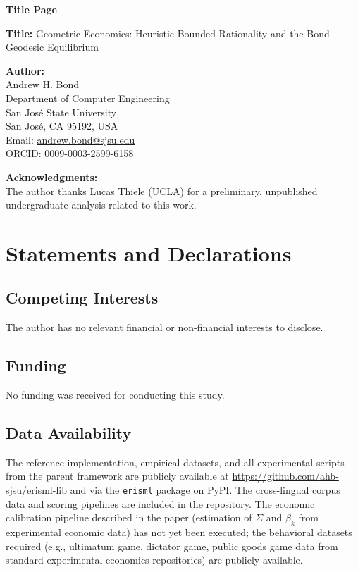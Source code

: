 \documentclass[12pt]{article}
\begin{document}
\begin{center}
{\LARGE\bfseries Title Page}
\end{center}

\bigskip

\noindent\textbf{Title:} Geometric Economics: Heuristic Bounded Rationality and the Bond Geodesic Equilibrium

\bigskip

\noindent\textbf{Author:}\\
Andrew H. Bond\\
Department of Computer Engineering\\
San Jos\'{e} State University\\
San Jos\'{e}, CA 95192, USA\\
Email: \href{mailto:andrew.bond@sjsu.edu}{andrew.bond@sjsu.edu}\\
ORCID: \href{https://orcid.org/0009-0003-2599-6158}{0009-0003-2599-6158}

\bigskip

\noindent\textbf{Acknowledgments:}\\
The author thanks Lucas Thiele (UCLA) for a preliminary, unpublished undergraduate analysis related to this work.

\bigskip

\section*{Statements and Declarations}

\subsection*{Competing Interests}
The author has no relevant financial or non-financial interests to disclose.

\subsection*{Funding}
No funding was received for conducting this study.

\subsection*{Data Availability}
The reference implementation, empirical datasets, and all experimental scripts from the parent framework are publicly available at \url{https://github.com/ahb-sjsu/erisml-lib} and via the \texttt{erisml} package on PyPI.  The cross-lingual corpus data and scoring pipelines are included in the repository.  The economic calibration pipeline described in the paper (estimation of $\Sigma$ and $\beta_k$ from experimental economic data) has not yet been executed; the behavioral datasets required (e.g., ultimatum game, dictator game, public goods game data from standard experimental economics repositories) are publicly available.
\end{document}
